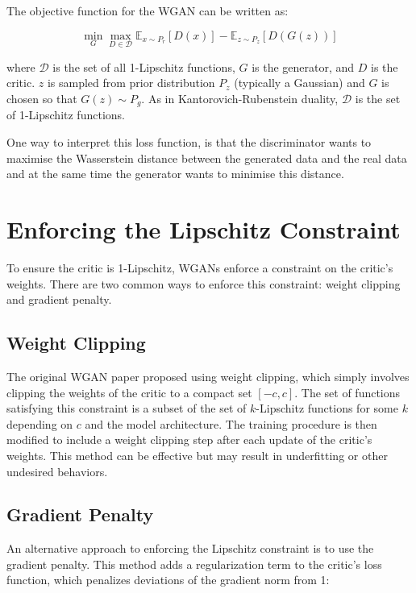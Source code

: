 The objective function for the WGAN can be written as:

\begin{equation}
\min_{G} \max_{D \in \mathcal{D}} \mathbb{E}_{x \sim P_r} [D(x)] - \mathbb{E}_{z \sim P_z} [D(G(z))]
\end{equation}

where $\mathcal{D}$ is the set of all 1-Lipschitz functions, $G$ is the generator, and $D$ is the critic. $z$ is sampled from prior distribution $P_z$ (typically a Gaussian) and $G$ is chosen so that $G(z)\sim P_g$. As in Kantorovich-Rubenstein duality, $\mathcal{D}$ is the set of 1-Lipschitz functions.

One way to interpret this loss function, is that the discriminator wants to maximise the Wasserstein distance between the generated data and the real data and at the same time the generator wants to minimise this distance.

\section{Enforcing the Lipschitz Constraint}

To ensure the critic is 1-Lipschitz, WGANs enforce a constraint on the critic's weights. There are two common ways to enforce this constraint: weight clipping and gradient penalty.

\subsection{Weight Clipping}

The original WGAN paper proposed using weight clipping, which simply involves clipping the weights of the critic to a compact set $[-c,c]$. The set of functions satisfying this constraint is a subset of the set of $k$-Lipschitz functions for some $k$ depending on $c$ and the model architecture. The training procedure is then modified to include a weight clipping step after each update of the critic's weights. This method can be effective but may result in underfitting or other undesired behaviors.

\subsection{Gradient Penalty}

An alternative approach to enforcing the Lipschitz constraint is to use the gradient penalty. This method adds a regularization term to the critic's loss function, which penalizes deviations of the gradient norm from 1:

